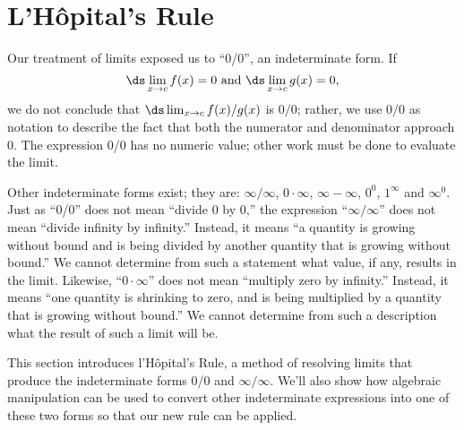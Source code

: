 \section{L'H\^opital's Rule}\label{sec:lhopitals_rule}


Our treatment of limits exposed us to ``0/0'', an indeterminate form. If 
\[
\ds \lim_{x\to c}f(x)=0 \text{ and } \ds \lim_{x\to c} g(x) =0,
\]
we do not conclude that $\ds \lim_{x\to c} f(x)/g(x)$ is $0/0$; rather, we use $0/0$ as notation to describe the fact that both the numerator and denominator approach 0. The expression 0/0 has no numeric value; other work must be done to evaluate the limit.

Other indeterminate forms exist; they are: %
 $\infty/\infty$, $0\cdot\infty$, $\infty-\infty$, $0^0$, $1^\infty$ and $\infty^0$. %
 Just as ``0/0'' does not mean ``divide 0 by 0,'' the expression ``$\infty/\infty$'' does not mean ``divide infinity by infinity.'' Instead, it means ``a quantity is growing without bound and is being divided by another quantity that is growing without bound.'' We cannot determine from such a statement what value, if any, results in the limit. Likewise, ``$0\cdot \infty$'' does not mean ``multiply zero by infinity.'' Instead, it means ``one quantity is shrinking to zero, and is being multiplied by a quantity that is growing without bound.'' We cannot determine from such a description what the result of such a limit will be.

This section introduces l'H\^opital's Rule, a method of resolving limits that produce the indeterminate forms 0/0 and $\infty/\infty$. We'll also show how algebraic manipulation can be used to convert other indeterminate expressions into one of these two forms so that our new rule can be applied.

